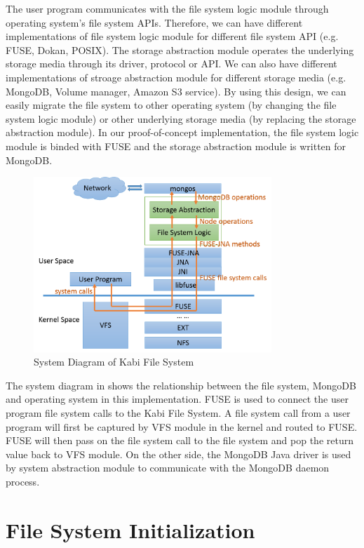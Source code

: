     The user program communicates with the file system logic module through operating system's file system APIs. Therefore, we can have different implementations of file system logic module for different file system API (e.g. FUSE, Dokan, POSIX). The storage abstraction module operates the underlying storage media through its driver, protocol or API. We can also have different implementations of stroage abstraction module for different storage media (e.g. MongoDB, Volume manager, Amazon S3 service). By using this design, we can easily migrate the file system to other operating system (by changing the file system logic module) or other underlying storage media (by replacing the storage abstraction module). In our proof-of-concept implementation, the file system logic module is binded with FUSE and the storage abstraction module is written for MongoDB. 

\begin{figure}[hbtp]
\centering
\includegraphics[width=0.8\textwidth]{Chapter-3/figs/fig1.png}
\caption{System Diagram of Kabi File System}
\label{fig:diagram}
\end{figure}

    The system diagram in  shows the relationship between the file system, MongoDB and operating system in this implementation. FUSE is used to connect the user program file system calls to the Kabi File System. A file system call from a user program will first be captured by VFS module in the kernel and routed to FUSE. FUSE will then pass on the file system call to the file system and pop the return value back to VFS module. On the other side, the MongoDB Java driver is used by system abstraction module to communicate with the MongoDB daemon process.

\section{File System Initialization}

